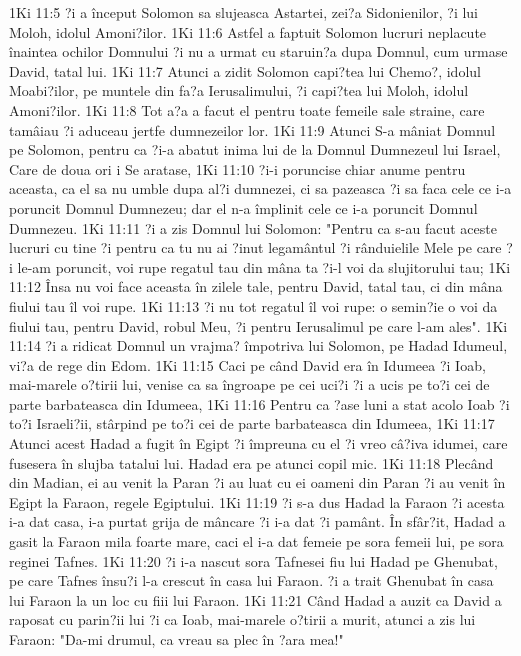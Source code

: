 1Ki 11:5  ?i a început Solomon sa slujeasca Astartei, zei?a Sidonienilor, ?i lui Moloh, idolul Amoni?ilor.
1Ki 11:6  Astfel a faptuit Solomon lucruri neplacute înaintea ochilor Domnului ?i nu a urmat cu staruin?a dupa Domnul, cum urmase David, tatal lui.
1Ki 11:7  Atunci a zidit Solomon capi?tea lui Chemo?, idolul Moabi?ilor, pe muntele din fa?a Ierusalimului, ?i capi?tea lui Moloh, idolul Amoni?ilor.
1Ki 11:8  Tot a?a a facut el pentru toate femeile sale straine, care tamâiau ?i aduceau jertfe dumnezeilor lor.
1Ki 11:9  Atunci S-a mâniat Domnul pe Solomon, pentru ca ?i-a abatut inima lui de la Domnul Dumnezeul lui Israel, Care de doua ori i Se aratase,
1Ki 11:10  ?i-i poruncise chiar anume pentru aceasta, ca el sa nu umble dupa al?i dumnezei, ci sa pazeasca ?i sa faca cele ce i-a poruncit Domnul Dumnezeu; dar el n-a împlinit cele ce i-a poruncit Domnul Dumnezeu.
1Ki 11:11  ?i a zis Domnul lui Solomon: "Pentru ca s-au facut aceste lucruri cu tine ?i pentru ca tu nu ai ?inut legamântul ?i rânduielile Mele pe care ?i le-am poruncit, voi rupe regatul tau din mâna ta ?i-l voi da slujitorului tau;
1Ki 11:12  Însa nu voi face aceasta în zilele tale, pentru David, tatal tau, ci din mâna fiului tau îl voi rupe.
1Ki 11:13  ?i nu tot regatul îl voi rupe: o semin?ie o voi da fiului tau, pentru David, robul Meu, ?i pentru Ierusalimul pe care l-am ales".
1Ki 11:14  ?i a ridicat Domnul un vrajma? împotriva lui Solomon, pe Hadad Idumeul, vi?a de rege din Edom.
1Ki 11:15  Caci pe când David era în Idumeea ?i Ioab, mai-marele o?tirii lui, venise ca sa îngroape pe cei uci?i ?i a ucis pe to?i cei de parte barbateasca din Idumeea,
1Ki 11:16  Pentru ca ?ase luni a stat acolo Ioab ?i to?i Israeli?ii, stârpind pe to?i cei de parte barbateasca din Idumeea,
1Ki 11:17  Atunci acest Hadad a fugit în Egipt ?i împreuna cu el ?i vreo câ?iva idumei, care fusesera în slujba tatalui lui. Hadad era pe atunci copil mic.
1Ki 11:18  Plecând din Madian, ei au venit la Paran ?i au luat cu ei oameni din Paran ?i au venit în Egipt la Faraon, regele Egiptului.
1Ki 11:19  ?i s-a dus Hadad la Faraon ?i acesta i-a dat casa, i-a purtat grija de mâncare ?i i-a dat ?i pamânt. În sfâr?it, Hadad a gasit la Faraon mila foarte mare, caci el i-a dat femeie pe sora femeii lui, pe sora reginei Tafnes.
1Ki 11:20  ?i i-a nascut sora Tafnesei fiu lui Hadad pe Ghenubat, pe care Tafnes însu?i l-a crescut în casa lui Faraon. ?i a trait Ghenubat în casa lui Faraon la un loc cu fiii lui Faraon.
1Ki 11:21  Când Hadad a auzit ca David a raposat cu parin?ii lui ?i ca Ioab, mai-marele o?tirii a murit, atunci a zis lui Faraon: "Da-mi drumul, ca vreau sa plec în ?ara mea!"
